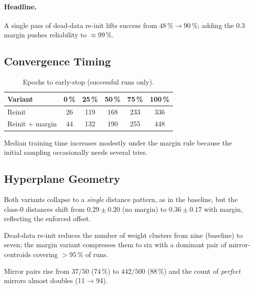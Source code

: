 \paragraph{Headline.}
A single pass of dead-data re-init lifts success from
$48\,\%\!\to\!90\,\%$;
adding the $0.3$ margin pushes reliability to \(\approx99\,\%\).

\subsection*{Convergence Timing}

\begin{table}[h]
\centering
\caption{Epochs to early-stop (successful runs only).}
\label{tab:relu1-reinit-epochs}
\begin{tabular}{lccccc}
\toprule
Variant & 0\,\% & 25\,\% & 50\,\% & 75\,\% & 100\,\% \\
\midrule
Reinit            & 26 & 119 & 168 & 233 & 336 \\
Reinit + margin   & 44 & 132 & 190 & 255 & 448 \\
\bottomrule
\end{tabular}
\end{table}

Median training time increases modestly under the margin rule because
the initial sampling occasionally needs several tries.

\subsection*{Hyperplane Geometry}

\begin{description}[leftmargin=2em]
  \item[Distance clusters] Both variants collapse to a \emph{single}
        distance pattern, as in the baseline, but the class-0 distances
        shift from \(0.29\pm0.20\) (no margin) to
        \(0.36\pm0.17\) with margin, reflecting the enforced offset.%
        
  \item[Weight clusters] Dead-data re-init reduces the number of weight
        clusters from nine (baseline) to seven; the margin variant
        compresses them to six with a dominant pair of mirror-centroids
        covering $>95\,\%$ of runs.%
  \item[Mirror symmetry] Mirror pairs rise from
        $37/50$ (74\,\%) to $442/500$ (88\,\%) and the count of
        \emph{perfect} mirrors almost doubles
        (11 → 94).%
\end{description}

